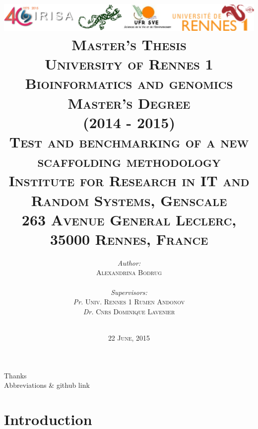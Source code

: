 \documentclass[10pt, twocolumn]{article}
\title{\includegraphics[scale=0.1]{logos} \vspace*{3\baselineskip}\\
        \large \textbf{\textsc{Master's Thesis}} \\
        \normalsize \textsc{University of Rennes 1} \\
        \normalsize \textsc{Bioinformatics and genomics Master's Degree} \\
        \normalsize \textsc{(2014 - 2015)} \vspace*{2\baselineskip} \\
		\large \textbf{\textsc{Test and benchmarking of a new scaffolding methodology}} \vspace*{0.5\baselineskip}\\
		\footnotesize \textsc{Institute for Research in IT and Random Systems, Genscale \\
		263 Avenue General Leclerc, 35000 Rennes, France}
        }
\author{\normalsize
	\begin{minipage}{0.4\textwidth}
	\begin{flushleft} 
	\emph{Author:}\\
	\textsc{Alexandrina Bodrug}
	\end{flushleft}
	\end{minipage}
	~
	\begin{minipage}{0.4\textwidth}
	\begin{flushright}
	\emph{Supervisors:} \\
	\textit{Pr.} \textsc{Univ. Rennes 1 Rumen Andonov} \\
	\textit{Dr.} \textsc{Cnrs Dominique Lavenier}
	\end{flushright}
	\end{minipage}\\[2cm]}
\date{\small \textsc{22 June, 2015}}
\begin{document}
\maketitle
\thispagestyle{empty}
\clearpage
\onecolumn
Thanks \\
\thispagestyle{empty}
\clearpage
\onecolumn
Abbreviations \& github link
\thispagestyle{empty}
\clearpage
\hypersetup{linkcolor=gray}
\tableofcontents
\thispagestyle{empty}
\newpage
\twocolumn
\section{Introduction}
\setcounter{page}{1}
\end{document}
